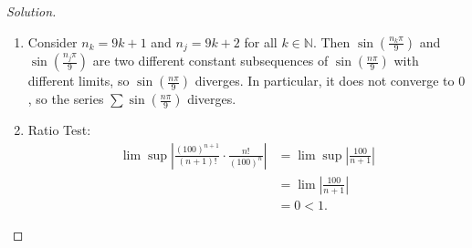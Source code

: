 \documentclass{article}
\begin{document}
\begin{proof}[Solution]
\begin{enumerate}[label=(\alph*)]
        \item Consider $n_k = 9k+1$ and $n_j = 9k+2$ for all $k\in\mathbb{N}$. 
        Then $\sin\left(\frac{n_k\pi}{9}\right)$ and $\sin\left(\frac{n_j\pi}{9}\right)$ are two 
        different constant subsequences of $\sin\left(\frac{n\pi}{9}\right)$ with different limits,
        so $\sin\left(\frac{n\pi}{9}\right)$ diverges. In particular, it does not converge to $0$,
        so the series $\sum\sin\left(\frac{n\pi}{9}\right)$ diverges.

        \item Ratio Test:
        \begin{align*}
            \lim\sup\left|\frac{(100)^{n+1}}{(n+1)!}\cdot\frac{n!}{(100)^n}\right| & = \lim\sup\left|\frac{100}{n+1}\right| \\
            & = \lim \left|\frac{100}{n+1}\right| \\
            & = 0 < 1.
        \end{align*}
    \end{enumerate}
\end{proof}
\end{document}
